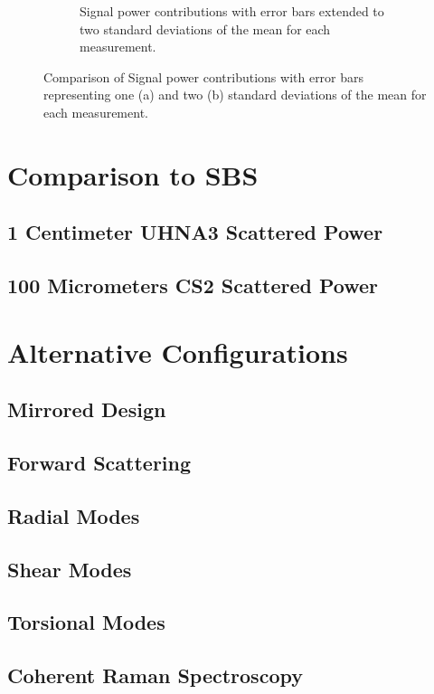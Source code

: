 \documentclass[%
  reprint,
  superscriptaddress,
  amsmath,amssymb,
  aps,
  prapplied,
]{revtex4-2}
\begin{document}
\begin{figure}[h]
\begin{subfigure}{0.45\textwidth}
    \caption{Signal power contributions with error bars extended to two standard deviations of the mean for each measurement.}
    \label{fig:PSPr-Contribute-Equally-2sigma}
  \end{subfigure}
  \caption{Comparison of Signal power contributions with error bars representing one (a) and two (b) standard deviations of the mean for each measurement.}
  \label{fig:combined}
\end{figure}


\section{Comparison to SBS}
\subsection{1 Centimeter UHNA3 Scattered Power}
\subsection{100 Micrometers CS2 Scattered Power}

\section{Alternative Configurations}
\subsection{Mirrored Design}
\subsection{Forward Scattering}
\subsection{Radial Modes}
\subsection{Shear Modes}
\subsection{Torsional Modes}
\subsection{Coherent Raman Spectroscopy}

\twocolumngrid

\end{document}
